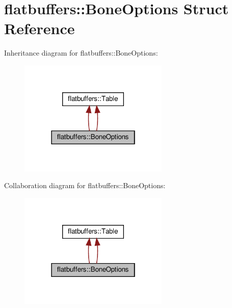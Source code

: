 \hypertarget{structflatbuffers_1_1BoneOptions}{}\section{flatbuffers\+:\+:Bone\+Options Struct Reference}
\label{structflatbuffers_1_1BoneOptions}


Inheritance diagram for flatbuffers\+:\+:Bone\+Options\+:
\nopagebreak
\begin{figure}[H]
\begin{center}
\leavevmode
\includegraphics[width=202pt]{structflatbuffers_1_1BoneOptions__inherit__graph}
\end{center}
\end{figure}


Collaboration diagram for flatbuffers\+:\+:Bone\+Options\+:
\nopagebreak
\begin{figure}[H]
\begin{center}
\leavevmode
\includegraphics[width=202pt]{structflatbuffers_1_1BoneOptions__coll__graph}
\end{center}
\end{figure}

